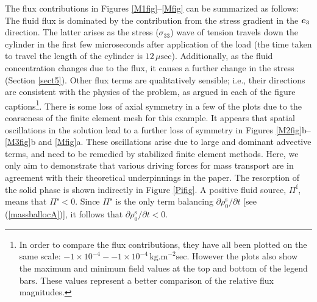 The flux contributions in Figures \ref{M1fig}--\ref{Mfig} can be
summarized as follows: The fluid flux is dominated by the
contribution from the stress gradient in the $\mbox{\boldmath$ e$}_3$ direction.
The latter arises as the stress ($\sigma_{33}$) wave of tension
travels down the cylinder in the first few microseconds after
application of the load (the time taken to travel the length of
the cylinder is $12 \,\mu\mathrm{sec}$). Additionally, as the
fluid concentration changes due to the flux, it causes a further
change in the stress (Section \ref{sect5}). Other flux terms are
qualitatively sensible; i.e., their directions are consistent with
the physics of the problem, as argued in each of the figure
captions\footnote{In order to compare the flux contributions, they
have all been plotted on the same scale: $-1\times
10^{-4}--1\times 10^{-4} \,\mathrm{kg.m}^{-2}\mathrm{sec}$.
However the plots also show the maximum and minimum field values
at the top and bottom of the legend bars. These values represent a
better comparison of the relative flux magnitudes.}. There is some
loss of axial symmetry in a few of the plots due to the coarseness
of the finite element mesh for this example. It appears that
spatial oscillations in the solution lead to a further loss of
symmetry in Figures \ref{M2fig}b--\ref{M3fig}b and \ref{Mfig}a.
These oscillations arise due to large and dominant advective
terms, and need to be remedied by stabilized finite element
methods. Here, we only aim to demonstrate that various driving
forces for mass transport are in agreement with their theoretical
underpinnings in the paper. The resorption of the solid phase is
shown indirectly in Figure \ref{Pifig}. A positive fluid source,
$\Pi^\mathrm{f}$, means that $\Pi^\mathrm{s} < 0$. Since
$\Pi^\mathrm{s}$ is the only term balancing
$\partial\rho_0^\mathrm{s}/\partial t$ [see (\ref{massballocA})],
it follows that $\partial\rho_0^\mathrm{s}/\partial t < 0$.

